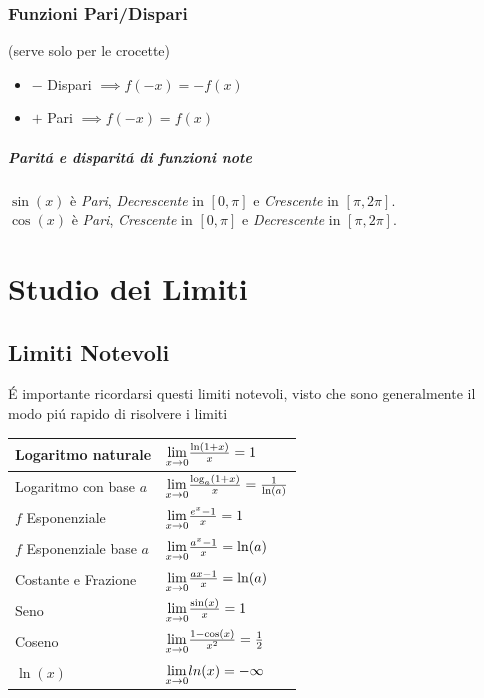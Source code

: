 \documentclass[12pt, a4paper, openany]{book}
\begin{document}
\subsection{Funzioni Pari/Dispari}
\small{(serve solo per le crocette)}
\begin{itemize}
	\item $-$ Dispari $\implies f(-x)=-f(x)$
	\item $+$ Pari $\implies f(-x)=f(x)$
\end{itemize}
\paragraph*{Paritá e disparitá di funzioni note}

$\sin(x)$ è \emph{Pari}, \emph{Decrescente} in $[0,\pi]$ e \emph{Crescente} in $[\pi,2\pi]$.
\\$\cos(x)$ è \emph{Pari}, \emph{Crescente} in $[0,\pi]$ e \emph{Decrescente} in $[\pi,2\pi]$.


\chapter{Studio dei Limiti}

\section{Limiti Notevoli}
É importante ricordarsi questi limiti notevoli, visto che sono generalmente il modo piú rapido di risolvere i limiti

\begin{tabularx}{\textwidth}{ |X|X| }
	\hline
	Logaritmo naturale        & $\underset{x \to 0}{\lim} \frac{\ln(1+x)}{x} = 1 $                   \\
	\hline
	Logaritmo con base $a$    & $\underset{x \to 0}{\lim} \frac{\log_a(1+x)}{x} = \frac{1}{\ln(a)} $ \\
	\hline
	$f$ Esponenziale          & $\underset{x \to 0}{\lim} \frac{e^x-1}{x} = 1$                       \\
	\hline
	$f$ Esponenziale base $a$ & $\underset{x \to 0}{\lim} \frac{a^x-1}{x} = \ln(a)$                  \\
	\hline
	Costante e Frazione       & $\underset{x \to 0}{\lim}\frac{ax -1}{x} = \ln(a)$                   \\
	\hline
	Seno                      & $\underset{x \to 0}{\lim}\frac{\sin(x)}{x} = 1$                      \\
	\hline
	Coseno                    & $\underset{x \to 0}{\lim} \frac{1-\cos(x)}{x^2} = \frac{1}{2} $      \\
	\hline
	\hline
	$\ln(x)$                  & $\underset{x \to 0}{\lim} ln(x) = -\infty $                          \\ %
	\hline
\end{tabularx}
\end{document}

